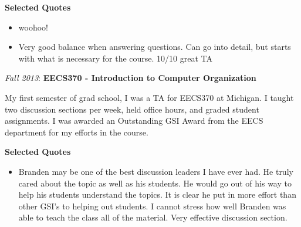 \documentclass[11pt]{article} %
\begin{document}
\hspace{\leftmargin}\textbf{Selected Quotes}
\begin{itemize}[noitemsep]
  \item woohoo!
  \item Very good balance when answering questions. Can go into detail, but starts with what is necessary for the course. 10/10 great TA
\end{itemize}


\bigskip
{\large \textit{Fall 2013}: \textbf{EECS370 - Introduction to Computer Organization}}

My first semester of grad school, I was a TA for EECS370 at Michigan.
%
I taught two discussion sections per week, held office hours, and graded
student assignments.
%
I was awarded an Outstanding GSI Award from the EECS department for my efforts
in the course.

\hspace{\leftmargin}\textbf{Selected Quotes}
\begin{itemize}[noitemsep]
  \item Branden may be one of the best discussion leaders I have ever had. He truly cared about the topic as well as his students. He would go out of his way to help his students understand the topics. It is clear he put in more effort than other GSI's to helping out students. I cannot stress how well Branden was able to teach the class all of the material. Very effective discussion section.
\end{itemize}
\end{document}
